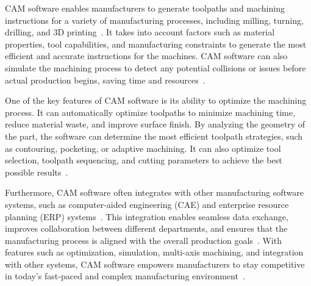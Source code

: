 
\acrshort{CAM} software enables manufacturers to generate toolpaths and machining instructions for a variety of manufacturing processes, including milling, turning, drilling, and 3D printing~\cite{Kumar.2019}. It takes into account factors such as material properties, tool capabilities, and manufacturing constraints to generate the most efficient and accurate instructions for the machines. \acrshort{CAM} software can also simulate the machining process to detect any potential collisions or issues before actual production begins, saving time and resources~\cite{Bui.2019}.

One of the key features of \acrshort{CAM} software is its ability to optimize the machining process. It can automatically optimize toolpaths to minimize machining time, reduce material waste, and improve surface finish. By analyzing the geometry of the part, the software can determine the most efficient toolpath strategies, such as contouring, pocketing, or adaptive machining. It can also optimize tool selection, toolpath sequencing, and cutting parameters to achieve the best possible results~\cite{Kyratsis.2020}.


Furthermore, \acrshort{CAM} software often integrates with other manufacturing software systems, such as computer-aided engineering (\acrshort{CAE}) and enterprise resource planning (\acrshort{ERP}) systems~\cite{Ramazanov.2020}. This integration enables seamless data exchange, improves collaboration between different departments, and ensures that the manufacturing process is aligned with the overall production goals~\cite{Kadam.2023}. With features such as optimization, simulation, multi-axis machining, and integration with other systems, \acrshort{CAM} software empowers manufacturers to stay competitive in today's fast-paced and complex manufacturing environment~\cite{Kappmeyer.2021}.


